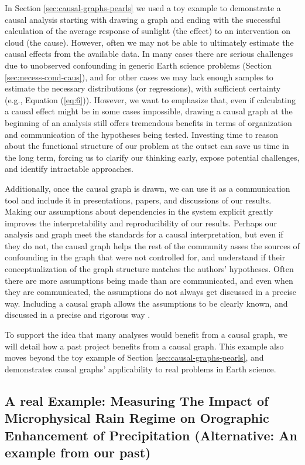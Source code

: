 \documentclass[12pt]{article}
\begin{document}
In Section \ref{sec:causal-graphs-pearls} we used a toy example to
demonstrate a causal analysis starting with drawing a graph and ending
with the successful calculation of the average response of sunlight
(the effect) to an intervention on cloud (the cause). However, often
we may not be able to ultimately estimate the causal effects from the
available data. In many cases there are serious challenges due to
unobserved confounding in generic Earth science problems (Section
\ref{sec:necess-cond-caus}), and for other cases we may lack enough
samples to estimate the necessary distributions (or regressions), with
sufficient certainty (e.g., Equation (\ref{eq:6})). However, we want
to emphasize that, even if calculating a causal effect might be in
some cases impossible, drawing a causal graph at the beginning of an
analysis still offers tremendous benefits in terms of organization and
communication of the hypotheses being tested. Investing time to reason
about the functional structure of our problem at the outset can save
us time in the long term, forcing us to clarify our thinking early,
expose potential challenges, and identify intractable approaches.

Additionally, once the causal graph is drawn, we can use it as a
communication tool and include it in presentations, papers, and
discussions of our results. Making our assumptions about dependencies
in the system explicit greatly improves the interpretability and
reproducibility of our results. Perhaps our analysis and graph meet
the standards for a causal interpretation, but even if they do not,
the causal graph helps the rest of the community asses the sources of
confounding in the graph that were not controlled for, and understand
if their conceptualization of the graph structure matches the authors'
hypotheses. Often there are more assumptions being made than are
communicated, and even when they are communicated, the assumptions do
not always get discussed in a precise way. Including a causal graph
allows the assumptions to be clearly known, and discussed in a precise
and rigorous way \citep{hannart-da}.

To support the idea that many analyses would benefit from a causal
graph, we will detail how a past project benefits from a causal
graph. This example also moves beyond the toy example of Section
\ref{sec:causal-graphs-pearls}, and demonstrates causal graphs'
applicability to real problems in Earth science.

\subsection{A real Example: Measuring The Impact of Microphysical Rain
  Regime on Orographic Enhancement of Precipitation (Alternative: An
  example from our past)}
\end{document}
